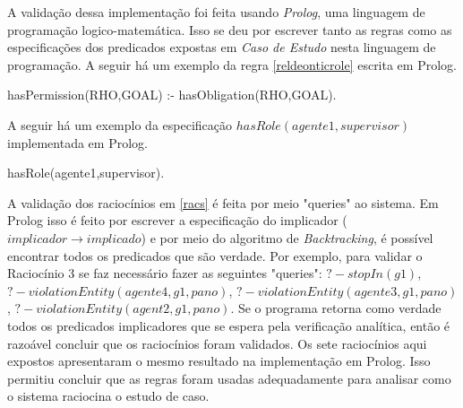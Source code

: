 A validação dessa implementação foi feita usando \textit{Prolog}, uma linguagem de programação logico-matemática. Isso se deu por escrever tanto as regras como as especificações dos predicados expostas em \textit{Caso de Estudo} nesta linguagem de programação. A seguir há um exemplo da regra \ref{reldeonticrole} escrita em Prolog.

hasPermission(RHO,GOAL) :- hasObligation(RHO,GOAL).

A seguir há um exemplo da especificação $hasRole(agente1,supervisor)$ implementada em Prolog.

hasRole(agente1,supervisor).

A validação dos raciocínios em \ref{racs} é feita por meio "queries" ao sistema. Em Prolog isso é feito por escrever a especificação do implicador ($implicador \to implicado$) e por meio do algoritmo de \textit{Backtracking}, é possível encontrar todos os predicados que são verdade. Por exemplo, para validar o Raciocínio 3 se faz necessário fazer as seguintes "queries": $? - stopIn(g1)$, $? - violationEntity(agente4,g1,pano)$, $? - violationEntity(agente3,g1,pano)$, $? - violationEntity(agent2,g1,pano)$. Se o programa retorna como verdade todos os predicados implicadores que se espera pela verificação analítica, então é razoável concluir que os raciocínios foram validados. Os sete raciocínios aqui expostos apresentaram o mesmo resultado na implementação em Prolog. Isso permitiu concluir que as regras foram usadas adequadamente para analisar como o sistema raciocina o estudo de caso. 